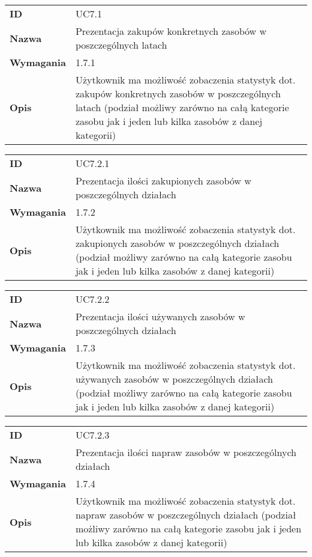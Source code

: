 \begin{tabular}{p{}p{}}
\hfill {\bf ID} & UC7.1 \\
\hfill {\bf Nazwa} &  Prezentacja zakupów konkretnych zasobów w poszczególnych latach \\
\hfill {\bf Wymagania} & 1.7.1 \\
\hfill {\bf Opis} & Użytkownik ma możliwość zobaczenia statystyk dot. zakupów konkretnych zasobów w poszczególnych latach (podział możliwy zarówno na całą kategorie zasobu jak i jeden lub kilka zasobów z danej kategorii) \\
\end{tabular}

\vspace{.05\textheight}

\begin{tabular}{p{}p{}}
\hfill {\bf ID} &  UC7.2.1 \\
\hfill {\bf Nazwa} & Prezentacja ilości zakupionych zasobów w poszczególnych działach \\
\hfill {\bf Wymagania} & 1.7.2 \\
\hfill {\bf Opis} & Użytkownik ma możliwość zobaczenia statystyk dot. zakupionych zasobów w poszczególnych działach (podział możliwy zarówno na całą kategorie zasobu jak i jeden lub kilka zasobów z danej kategorii) \\
\end{tabular}

\vspace{.05\textheight}

\begin{tabular}{p{}p{}}
\hfill {\bf ID} & UC7.2.2 \\
\hfill {\bf Nazwa} & Prezentacja ilości używanych zasobów w poszczególnych działach \\
\hfill {\bf Wymagania} & 1.7.3 \\
\hfill {\bf Opis} & Użytkownik ma możliwość zobaczenia statystyk dot. używanych zasobów w poszczególnych działach (podział możliwy zarówno na całą kategorie zasobu jak i jeden lub kilka zasobów z danej kategorii) \\
\end{tabular}

\vspace{.05\textheight}

\begin{tabular}{p{}p{}}
\hfill {\bf ID} & UC7.2.3 \\
\hfill {\bf Nazwa} &  Prezentacja ilości napraw zasobów w poszczególnych działach \\
\hfill {\bf Wymagania} & 1.7.4 \\
\hfill {\bf Opis} &  Użytkownik ma możliwość zobaczenia statystyk dot. napraw zasobów w poszczególnych działach (podział możliwy zarówno na całą kategorie zasobu jak i jeden lub kilka zasobów z danej kategorii) \\
\end{tabular}

